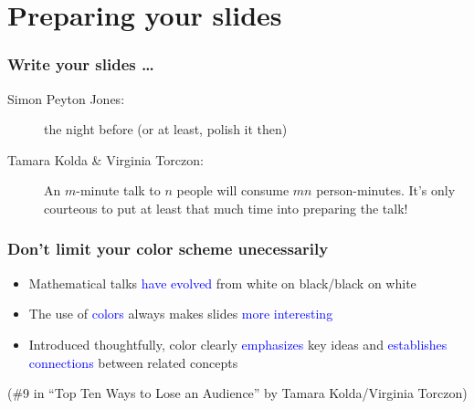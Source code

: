 \documentclass[aspectratio=43,10pt,ucs]{beamer} %
\begin{document}
\section{Preparing your slides}
\begin{frame}
  \frametitle{Write your slides …}

  \begin{description}
  \item[Simon Peyton Jones:] the night before (or at least, polish it
    then)
  \item[Tamara Kolda \& Virginia Torczon:] An $m$-minute talk to $n$
    people \alert{will consume $mn$ person-minutes}. It's only
    courteous to put at least that much time into preparing the talk!
  \end{description}

  \vspace*{1em}


\end{frame}
\begin{frame}
  \frametitle{Don't limit your color scheme unecessarily}

  \begin{itemize}
  \item Mathematical talks \textcolor{blue}{have evolved} from white
    on black/black on white
  \item The use of \textcolor{blue}{colors} always makes slides
    \textcolor{blue}{more interesting}
  \item Introduced thoughtfully, color clearly
    \textcolor{blue}{emphasizes} key ideas and
    \textcolor{blue}{establishes connections} between related concepts
  \end{itemize}

  \vspace*{3em}
  
  (\#9 in ``Top Ten Ways to Lose an Audience'' by Tamara Kolda/Virginia
   Torczon)

\end{frame}
\end{document}
